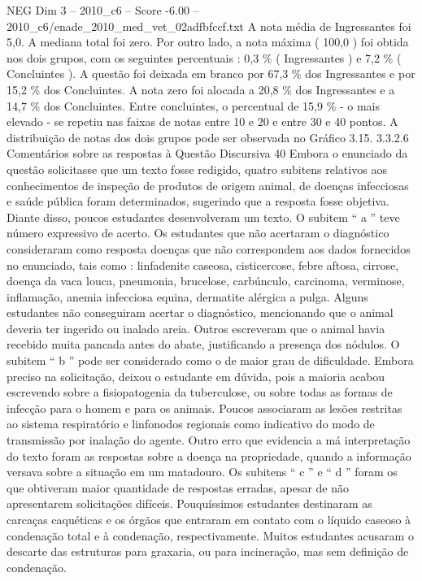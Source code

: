 \begin{textsample}{NEG Dim 3 – 2010\_c6 – Score -6.00 – 2010\_c6/enade\_2010\_med\_vet\_02adfbfccf.txt}
A nota média de Ingressantes foi 5,0.
A mediana total foi zero.
Por outro lado, a nota máxima ( 100,0 ) foi obtida nos dois grupos, com os seguintes percentuais : 0,3 \% ( Ingressantes ) e 7,2 \% ( Concluintes ).
A questão foi deixada em branco por 67,3 \% dos Ingressantes e por 15,2 \% dos Concluintes.
A nota zero foi alocada a 20,8 \% dos Ingressantes e a 14,7 \% dos Concluintes.
Entre concluintes, o percentual de 15,9 \% - o mais elevado - se repetiu nas faixas de notas entre 10 e 20 e entre 30 e 40 pontos.
A distribuição de notas dos dois grupos pode ser observada no Gráfico 3.15. 3.3.2.6 Comentários sobre as respostas à Questão Discursiva 40 Embora o enunciado da questão solicitasse que um texto fosse redigido, quatro subitens relativos aos conhecimentos de inspeção de produtos de origem animal, de doenças infecciosas e saúde pública foram determinados, sugerindo que a resposta fosse objetiva.
Diante disso, poucos estudantes desenvolveram um texto.
O subitem “ a ” teve número expressivo de acerto.
Os estudantes que não acertaram o diagnóstico consideraram como resposta doenças que não correspondem aos dados fornecidos no enunciado, tais como : linfadenite caseosa, cisticercose, febre aftosa, cirrose, doença da vaca louca, pneumonia, brucelose, carbúnculo, carcinoma, verminose, inflamação, anemia infecciosa equina, dermatite alérgica a pulga.
Alguns estudantes não conseguiram acertar o diagnóstico, mencionando que o animal deveria ter ingerido ou inalado areia.
Outros escreveram que o animal havia recebido muita pancada antes do abate, justificando a presença dos nódulos.
O subitem “ b ” pode ser considerado como o de maior grau de dificuldade.
Embora preciso na solicitação, deixou o estudante em dúvida, pois a maioria acabou escrevendo sobre a fisiopatogenia da tuberculose, ou sobre todas as formas de infecção para o homem e para os animais.
Poucos associaram as lesões restritas ao sistema respiratório e linfonodos regionais como indicativo do modo de transmissão por inalação do agente.
Outro erro que evidencia a má interpretação do texto foram as respostas sobre a doença na propriedade, quando a informação versava sobre a situação em um matadouro.
Os subitens “ c ” e “ d ” foram os que obtiveram maior quantidade de respostas erradas, apesar de não apresentarem solicitações difíceis.
Pouquíssimos estudantes destinaram as carcaças caquéticas e os órgãos que entraram em contato com o líquido caseoso à condenação total e à condenação, respectivamente.
Muitos estudantes acusaram o descarte das estruturas para graxaria, ou para incineração, mas sem definição de condenação.

\end{textsample}
